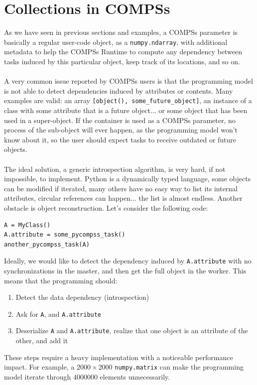 \chapter{Collections in COMPSs}
\label{sec:col}
As we have seen in previous sections and examples, a COMPSs parameter is basically a regular user-code object, as a \verb|numpy.ndarray|, with additional metadata to help the COMPSs Runtime to compute any dependency between tasks induced by this particular object, keep track of its locations, and so on.\\
\\
A very common issue reported by COMPSs users is that the programming model is not able to detect dependencies induced by attributes or contents. Many examples are valid: an array \verb|[object(), some_future_object]|, an instance of a class with some attribute that is a future object... or some object that has been used in a super-object. If the container is used as a COMPSs parameter, no process of the sub-object will ever happen, as the programming model won't know about it, so the user should expect tasks to receive outdated or future objects.\\
\\
The ideal solution, a generic introspection algorithm, is very hard, if not impossible, to implement. Python is a dynamically typed language, some objects can be modified if iterated, many others have no easy way to list its internal attributes, circular references can happen... the list is almost endless. Another obstacle is object reconstruction. Let's consider the following code:
\begin{verbatim}
A = MyClass()
A.attribute = some_pycompss_task()
another_pycompss_task(A)
\end{verbatim}
Ideally, we would like to detect the dependency induced by \verb|A.attribute| with no synchronizations in the master, and then get the full object in the worker. This means that the programming should:
\begin{enumerate}
\item Detect the data dependency (introspection)
\item Ask for \verb|A|, and \verb|A.attribute|
\item Deserialize \verb|A| and \verb|A.attribute|, realize that one object is an attribute of the other, and add it
\end{enumerate}
These steps require a heavy implementation with a noticeable performance impact. For example, a $2000 \times 2000$ \verb|numpy.matrix| can make the programming model iterate through $4000000$ elements unnecessarily.\\
